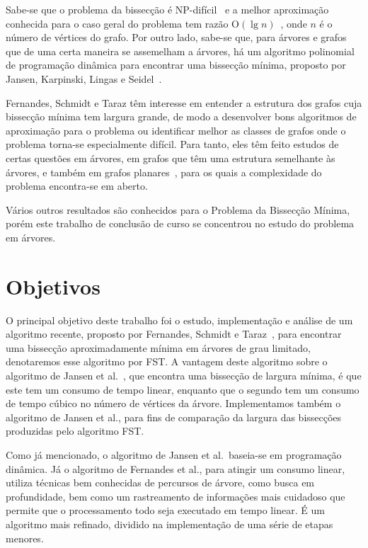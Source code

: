 \documentclass[a4paper,12pt]{article}
\newcommand{\Oh}{\mathrm{O}}
\begin{document}
Sabe-se que o problema da bissecção é NP-difícil~\cite{GareyJS76} 
e a melhor aproximação conhecida para o caso geral do problema tem 
razão $\Oh(\lg n)$~\cite{Racke08}, onde $n$ é o número de vértices 
do grafo. 
Por outro lado, sabe-se que, para árvores e grafos que de uma 
certa maneira se assemelham a árvores, há um algoritmo polinomial 
de programação dinâmica para encontrar uma bissecção mínima, 
proposto por Jansen, Karpinski, Lingas e 
Seidel~\cite{JansenKLS01}. 

Fernandes, Schmidt e Taraz têm interesse em entender a estrutura 
dos grafos cuja bissecção mínima tem largura grande, de modo a 
desenvolver bons algoritmos de aproximação para o problema ou 
identificar melhor as classes de grafos onde o problema torna-se 
especialmente difícil. 
Para tanto, eles têm feito estudos de certas questões em árvores, 
em grafos que têm uma estrutura semelhante às árvores, e também em 
grafos planares~\cite{FernandesST13,FernandesST15}, para os quais 
a complexidade do problema encontra-se em aberto. 

Vários outros resultados são conhecidos para o Problema da 
Bissecção Mínima, porém este trabalho de conclusão de curso se 
concentrou no estudo do problema em árvores.

\newpage



\section{Objetivos} 

O principal objetivo deste trabalho foi o estudo, implementação e 
análise de um algoritmo recente, proposto por Fernandes, Schmidt e 
Taraz~\cite{FernandesST13}, para encontrar uma bissecção 
aproximadamente mínima em árvores de grau limitado, denotaremos
esse algoritmo por FST. 
A vantagem deste algoritmo sobre o algoritmo de Jansen et 
al.~\cite{JansenKLS01}, que encontra uma bissecção de largura 
mínima, é que este tem um consumo de tempo linear, enquanto que o 
segundo tem um consumo de tempo cúbico no número de vértices da 
árvore. 
Implementamos também o algoritmo de Jansen et al., para fins de 
comparação da largura das bissecções produzidas pelo algoritmo
FST. 

Como já mencionado, o algoritmo de Jansen et al.\ baseia-se em 
programação dinâmica. 
Já o algoritmo de Fernandes et al., para atingir um consumo 
linear, utiliza técnicas bem conhecidas de percursos de árvore, 
como busca em profundidade, bem como um rastreamento de 
informações mais cuidadoso que permite que o processamento todo 
seja executado em tempo linear. 
É um algoritmo mais refinado, dividido na implementação de uma 
série de etapas menores. 
\end{document}
